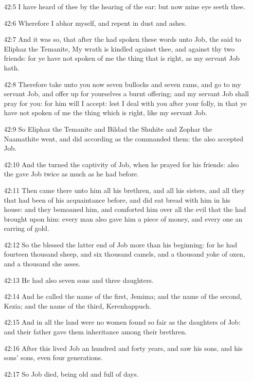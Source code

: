 42:5 I have heard of thee by the hearing of the ear: but now mine eye
seeth thee.

42:6 Wherefore I abhor myself, and repent in dust and ashes.

42:7 And it was so, that after the \LORD had spoken these words unto
Job, the \LORD said to Eliphaz the Temanite, My wrath is kindled
against thee, and against thy two friends: for ye have not spoken of
me the thing that is right, as my servant Job hath.

42:8 Therefore take unto you now seven bullocks and seven rams, and go
to my servant Job, and offer up for yourselves a burnt offering; and
my servant Job shall pray for you: for him will I accept: lest I deal
with you after your folly, in that ye have not spoken of me the thing
which is right, like my servant Job.

42:9 So Eliphaz the Temanite and Bildad the Shuhite and Zophar the
Naamathite went, and did according as the \LORD commanded them: the
\LORD also accepted Job.

42:10 And the \LORD turned the captivity of Job, when he prayed for his
friends: also the \LORD gave Job twice as much as he had before.

42:11 Then came there unto him all his brethren, and all his sisters,
and all they that had been of his acquaintance before, and did eat
bread with him in his house: and they bemoaned him, and comforted him
over all the evil that the \LORD had brought upon him: every man also
gave him a piece of money, and every one an earring of gold.

42:12 So the \LORD blessed the latter end of Job more than his
beginning: for he had fourteen thousand sheep, and six thousand
camels, and a thousand yoke of oxen, and a thousand she asses.

42:13 He had also seven sons and three daughters.

42:14 And he called the name of the first, Jemima; and the name of the
second, Kezia; and the name of the third, Kerenhappuch.

42:15 And in all the land were no women found so fair as the daughters
of Job: and their father gave them inheritance among their brethren.

42:16 After this lived Job an hundred and forty years, and saw his
sons, and his sons' sons, even four generations.

42:17 So Job died, being old and full of days.

